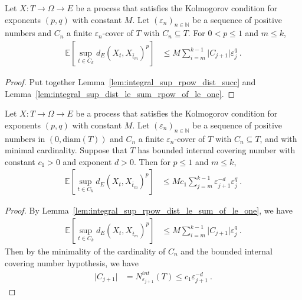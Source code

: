 \begin{lemma}\label{lem:integral_sup_rpow_dist_le_sum_of_le_one}
  \leanok
Let $X : T \to \Omega \to E$ be a process that satisfies the Kolmogorov condition for exponents $(p,q)$ with constant $M$.
Let $(\varepsilon_n)_{n \in \mathbb{N}}$ be a sequence of positive numbers and $C_n$ a finite $\varepsilon_n$-cover of $T$ with $C_n \subseteq T$.
For $0 < p \le 1$ and $m \le k$,
\begin{align*}
  \mathbb{E}\left[\sup_{t \in C_k} d_E(X_t, X_{\bar{t}_m})^p \right]
  &\le M \sum_{i=m}^{k-1} \vert C_{j+1} \vert \varepsilon_j^{q}
  \: .
\end{align*}
\end{lemma}

\begin{proof}\leanok
Put together Lemma~\ref{lem:integral_sup_rpow_dist_succ} and Lemma~\ref{lem:integral_sup_dist_le_sum_rpow_of_le_one}.
\end{proof}


\begin{lemma}\label{lem:integral_sup_rpow_dist_le_of_minimal_cover_of_le_one}
  \leanok
Let $X : T \to \Omega \to E$ be a process that satisfies the Kolmogorov condition for exponents $(p,q)$ with constant $M$.
Let $(\varepsilon_n)_{n \in \mathbb{N}}$ be a sequence of positive numbers in $(0, \mathrm{diam}(T))$ and $C_n$ a finite $\varepsilon_n$-cover of $T$ with $C_n \subseteq T$, and with minimal cardinality.
Suppose that $T$ has bounded internal covering number with constant $c_1>0$ and exponent $d > 0$.
Then for $p \le 1$ and $m \le k$,
\begin{align*}
  \mathbb{E} \left[\sup_{t \in C_k} d_E(X_t, X_{\bar{t}_m})^p \right]
  &\le M c_1 \sum_{j=m}^{k-1} \varepsilon_{j+1}^{-d} \varepsilon_j^{q}
  \: .
\end{align*}
\end{lemma}

\begin{proof}\leanok
By Lemma~\ref{lem:integral_sup_rpow_dist_le_sum_of_le_one}, we have
\begin{align*}
  \mathbb{E}\left[\sup_{t \in C_k} d_E(X_t, X_{\bar{t}_m})^p \right]
  &\le M \sum_{i=m}^{k-1} \vert C_{j+1} \vert \varepsilon_j^{q}
  \: .
\end{align*}
Then by the minimality of the cardinality of $C_n$ and the bounded internal covering number hypothesis, we have
\begin{align*}
  \vert C_{j+1} \vert
  &= N^{int}_{\varepsilon_{j+1}}(T)
  \le c_1 \varepsilon_{j+1}^{-d}
  \: .
\end{align*}
\end{proof}


